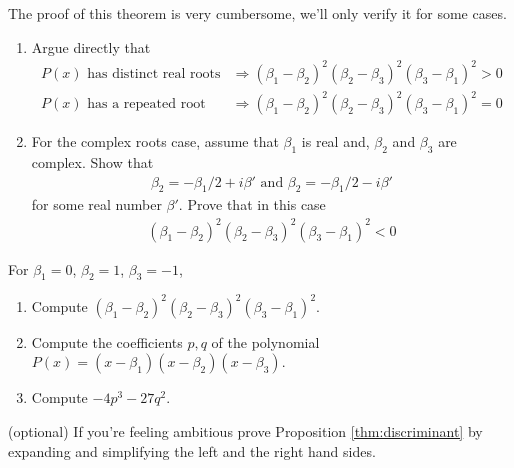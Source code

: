The proof of this theorem is very cumbersome, we'll only verify it for some cases.
\begin{questions}[resume]
	\item 
	\begin{enumerate}
		\item Argue directly that
		\begin{align*}
			P(x) \mbox{ has distinct real roots} & \Rightarrow  (\beta_1 - \beta_2)^2(\beta_2 - \beta_3)^2(\beta_3 - \beta_1)^2 > 0\\
			 P(x) \mbox{ has a repeated root}  & \Rightarrow  (\beta_1 - \beta_2)^2(\beta_2 - \beta_3)^2(\beta_3 - \beta_1)^2 = 0
		\end{align*}
	\item For the complex roots case, assume that $ \beta_1$ is real and, $ \beta_2 $ and $ \beta_3$ are complex. Show that 
		\begin{align*}
			\beta_2 = -\beta_1/2 + i \beta' \mbox{ and } \beta_2 = -\beta_1/2 - i \beta'
		\end{align*}
		for some real number $ \beta'$. Prove that in this case
		\begin{align*}
		  (\beta_1 - \beta_2)^2(\beta_2 - \beta_3)^2(\beta_3 - \beta_1)^2 < 0
		\end{align*}	
	\end{enumerate}
\end{questions}



\begin{questions}[resume]
	\item For $ \beta_1 = 0$, $\beta_2 = 1$, $\beta_3 = -1$,
	\begin{enumerate}
		\item Compute $(\beta_1 - \beta_2)^2(\beta_2 - \beta_3)^2(\beta_3 - \beta_1)^2$.
		\item Compute the coefficients $ p,q$ of the polynomial $ P(x) = (x - \beta_1)(x - \beta_2)(x - \beta_3)$. 
		\item Compute $-4p^3 - 27q^2$.
	\end{enumerate}
\end{questions}

\begin{questions}[resume]
  \item (optional) If you're feeling ambitious prove Proposition \ref{thm:discriminant} by expanding and simplifying the left and the right hand sides.
\end{questions}






